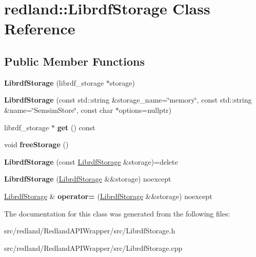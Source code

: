\hypertarget{classredland_1_1LibrdfStorage}{}\section{redland\+:\+:Librdf\+Storage Class Reference}
\label{classredland_1_1LibrdfStorage}
\subsection*{Public Member Functions}
\begin{DoxyCompactItemize}
\item 
\mbox{\label{classredland_1_1LibrdfStorage_a8e3250af4dea528dcf94865835cfb8ff}} 
{\bfseries Librdf\+Storage} (librdf\+\_\+storage $\ast$storage)
\item 
\mbox{\label{classredland_1_1LibrdfStorage_a08c025b165113efe1163c7294b989755}} 
{\bfseries Librdf\+Storage} (const std\+::string \&storage\+\_\+name=\char`\"{}memory\char`\"{}, const std\+::string \&name=\char`\"{}Semsim\+Store\char`\"{}, const char $\ast$options=nullptr)
\item 
\mbox{\label{classredland_1_1LibrdfStorage_a182d617ba7ab1b5359ef2693a56b272e}} 
librdf\+\_\+storage $\ast$ {\bfseries get} () const
\item 
\mbox{\label{classredland_1_1LibrdfStorage_a7b08e7afd5ac5f38a0ed4cfeb77a3b99}} 
void {\bfseries free\+Storage} ()
\item 
\mbox{\label{classredland_1_1LibrdfStorage_a7cef1518384fd6592ee8521cb95eb25d}} 
{\bfseries Librdf\+Storage} (const \hyperlink{classredland_1_1LibrdfStorage}{Librdf\+Storage} \&storage)=delete
\item 
\mbox{\label{classredland_1_1LibrdfStorage_a59184a87b901f1d3709d045d57311606}} 
{\bfseries Librdf\+Storage} (\hyperlink{classredland_1_1LibrdfStorage}{Librdf\+Storage} \&\&storage) noexcept
\item 
\mbox{\label{classredland_1_1LibrdfStorage_a1366716bbd3a0e41979d632c532c71ec}} 
\hyperlink{classredland_1_1LibrdfStorage}{Librdf\+Storage} \& {\bfseries operator=} (\hyperlink{classredland_1_1LibrdfStorage}{Librdf\+Storage} \&\&storage) noexcept
\end{DoxyCompactItemize}


The documentation for this class was generated from the following files\+:\begin{DoxyCompactItemize}
\item 
src/redland/\+Redland\+A\+P\+I\+Wrapper/src/Librdf\+Storage.\+h\item 
src/redland/\+Redland\+A\+P\+I\+Wrapper/src/Librdf\+Storage.\+cpp\end{DoxyCompactItemize}
